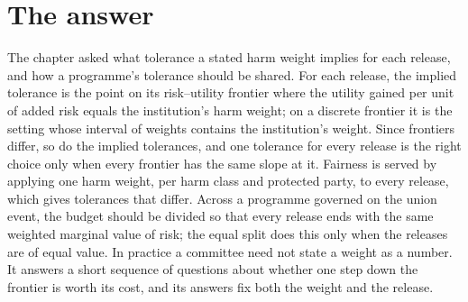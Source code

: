 \section{The answer}\label{c08:sec-answer}

The chapter asked what tolerance a stated harm weight implies for each release, and
how a programme's tolerance should be shared. For each release, the implied
tolerance is the point on its risk--utility frontier where the utility gained per
unit of added risk equals the institution's harm weight; on a discrete frontier it
is the setting whose interval of weights contains the institution's weight. Since
frontiers differ, so do the implied tolerances, and one tolerance for every release
is the right choice only when every frontier has the same slope at it. Fairness is
served by applying one harm weight, per harm class and protected party, to every
release, which gives tolerances that differ. Across a programme governed on the
union event, the budget should be divided so that every release ends with the same
weighted marginal value of risk; the equal split does this only when the releases
are of equal value. In practice a committee need not state a weight as a number. It
answers a short sequence of questions about whether one step down the frontier is
worth its cost, and its answers fix both the weight and the release.

